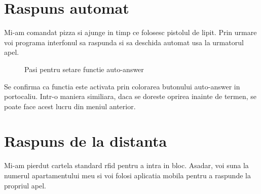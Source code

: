 \section{Raspuns automat}

Mi-am comandat pizza si ajunge in timp ce folosesc pistolul de lipit. Prin urmare voi programa interfonul sa raspunda si sa deschida automat usa la urmatorul apel.

\begin{figure}[H]
\begin{center}
  \hfil
  \caption{Pasi pentru setare functie auto-answer}
  \label{fig:autoanswer}
\end{center}
\end{figure}

Se confirma ca functia este activata prin colorarea butonului auto-answer in portocaliu. Intr-o maniera similiara, daca se doreste oprirea inainte de termen, se poate face acest lucru din meniul anterior.

\section{Raspuns de la distanta}

Mi-am pierdut cartela standard \acrfull{rfid} pentru a intra in bloc. Asadar, voi suna la numerul apartamentului meu si voi folosi aplicatia mobila pentru a raspunde la propriul apel.
